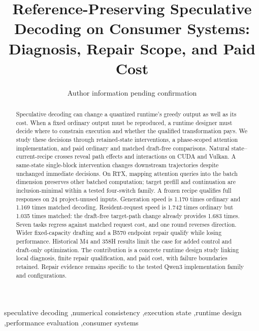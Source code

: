 \documentclass[preprint,12pt,nopreprintline]{elsarticle}
\begin{document}
\begin{frontmatter}
\title{Reference-Preserving Speculative Decoding on Consumer Systems: Diagnosis, Repair Scope, and Paid Cost}
\author{Author information pending confirmation}
\begin{abstract}
Speculative decoding can change a quantized runtime's greedy output as well as its cost. When a fixed ordinary output must be reproduced, a runtime designer must decide where to constrain execution and whether the qualified transformation pays. We study these decisions through retained-state interventions, a phase-scoped attention implementation, and paid ordinary and matched draft-free comparisons. Natural state--current-recipe crosses reveal path effects and interactions on CUDA and Vulkan. A same-state single-block intervention changes downstream trajectories despite unchanged immediate decisions. On RTX, mapping attention queries into the batch dimension preserves other batched computation; target prefill and continuation are inclusion-minimal within a tested four-switch family. A frozen recipe qualifies full responses on 24 project-unused inputs. Generation speed is 1.170 times ordinary and 1.169 times matched decoding. Resident-request speed is 1.742 times ordinary but 1.035 times matched: the draft-free target-path change already provides 1.683 times. Seven tasks regress against matched request cost, and one round reverses direction. Wider fixed-capacity drafting and a B570 endpoint repair qualify while losing performance. Historical M4 and 358H results limit the case for added control and draft-only optimization. The contribution is a concrete runtime design study linking local diagnosis, finite repair qualification, and paid cost, with failure boundaries retained. Repair evidence remains specific to the tested Qwen3 implementation family and configurations.
\end{abstract}
\begin{keyword}
speculative decoding \sep numerical consistency \sep execution state \sep runtime design \sep performance evaluation \sep consumer systems
\end{keyword}
\end{frontmatter}









\begingroup\small


\endgroup
\end{document}

